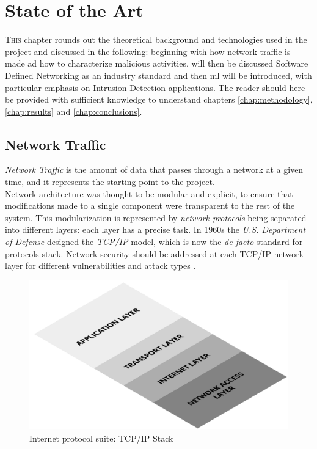 \chapter{State of the Art}
\label{chap:state-of-the-art}

\lettrine[lines=3, findent=3pt, nindent=0pt]{T}{his} chapter rounds out the theoretical background and technologies used in the project and discussed in the following: beginning with how network traffic is made ad how to characterize malicious activities, will then be discussed Software Defined Networking as an industry standard and then \gls{ml} will be introduced, with particular emphasis on Intrusion Detection applications. The reader should here be provided with sufficient knowledge to understand chapters \ref{chap:methodology}, \ref{chap:results} and \ref{chap:conclusions}.


\section{Network Traffic}
\label{sec:network-traffic}

\textit{Network Traffic} is the amount of data that passes through a network at a given time, and it represents the starting point to the project. \\ Network architecture was thought to be modular and explicit, to ensure that modifications made to a single component were transparent to the rest of the system. This modularization is represented by \textit{network protocols} being separated into different layers: each layer has a precise task. In 1960s the \textit{U.S. Department of Defense} designed the \textit{TCP/IP} model, which is now the \textit{de facto} standard for protocols stack. Network security should be addressed at each TCP/IP network layer for different vulnerabilities and attack types \cite{Zaman2009}.

\begin{figure}[h!]
    \centering
    \includegraphics[scale=0.25]{assets/figures/chapter2/TCP_IP Stack.png}
    \caption{Internet protocol suite: TCP/IP Stack}
    \label{fig:TCP/IP-stack}
\end{figure}

